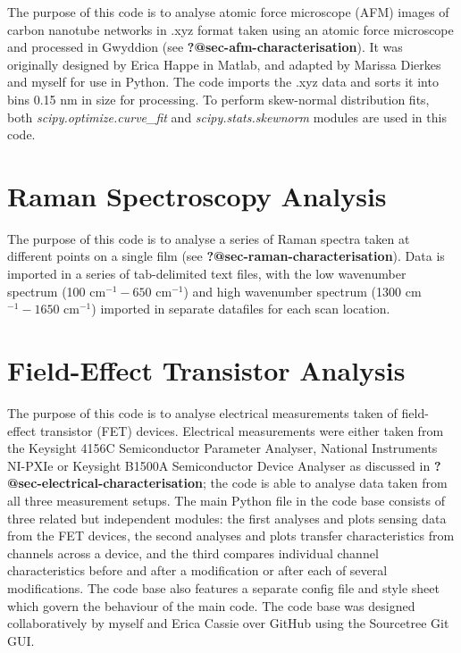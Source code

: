 \documentclass[
  a4paper,
]{scrbook}
\begin{document}
The purpose of this code is to analyse atomic force microscope (AFM)
images of carbon nanotube networks in .xyz format taken using an atomic
force microscope and processed in Gwyddion (see
\textbf{?@sec-afm-characterisation}). It was originally designed by
Erica Happe in Matlab, and adapted by Marissa Dierkes and myself for use
in Python. The code imports the .xyz data and sorts it into bins 0.15 nm
in size for processing. To perform skew-normal distribution fits, both
\emph{scipy.optimize.curve\_fit} and \emph{scipy.stats.skewnorm} modules
are used in this code.

\hypertarget{sec-raman-analysis}{%
\section{Raman Spectroscopy Analysis}\label{sec-raman-analysis}}

The purpose of this code is to analyse a series of Raman spectra taken
at different points on a single film (see
\textbf{?@sec-raman-characterisation}). Data is imported in a series of
tab-delimited text files, with the low wavenumber spectrum (100
cm\(^{-1} - 650\) cm\(^{-1}\)) and high wavenumber spectrum (1300
cm\(^{-1} - 1650\) cm\(^{-1}\)) imported in separate datafiles for each
scan location.

\hypertarget{sec-field-effect-transistor-analysis}{%
\section{Field-Effect Transistor
Analysis}\label{sec-field-effect-transistor-analysis}}

The purpose of this code is to analyse electrical measurements taken of
field-effect transistor (FET) devices. Electrical measurements were
either taken from the Keysight 4156C Semiconductor Parameter Analyser,
National Instruments NI-PXIe or Keysight B1500A Semiconductor Device
Analyser as discussed in \textbf{?@sec-electrical-characterisation}; the
code is able to analyse data taken from all three measurement setups.
The main Python file in the code base consists of three related but
independent modules: the first analyses and plots sensing data from the
FET devices, the second analyses and plots transfer characteristics from
channels across a device, and the third compares individual channel
characteristics before and after a modification or after each of several
modifications. The code base also features a separate config file and
style sheet which govern the behaviour of the main code. The code base
was designed collaboratively by myself and Erica Cassie over GitHub
using the Sourcetree Git GUI.
\end{document}
